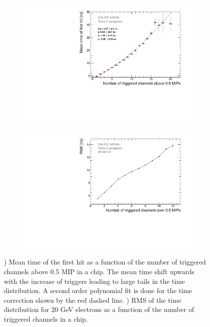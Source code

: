 \documentclass{JINST}
\begin{document}
\begin{figure}[htbp!]
  \begin{subfigure}[t]{0.49\textwidth}
    \centering
    \includegraphics[width=1\linewidth]{fig/NumberHits_Dependance_AllEnergies.pdf}
    \caption{} \label{fig:nhits_profile}
  \end{subfigure}
  \hfill
  \begin{subfigure}[t]{0.49\textwidth}
    \centering
    \includegraphics[width=1\linewidth]{fig/ParametrisationPedestalShift_20GeV.pdf}
    \caption{} \label{fig:nhits_RMS_profile}
  \end{subfigure}
  \caption{) Mean time of the first hit as a function of the number of triggered channels above 0.5 MIP in a chip. The mean time shift upwards with the increase of triggers leading to large tails in the time distribution. A second order polynomial fit is done for the time correction shown by the red dashed line. ) RMS of the time distribution for 20 GeV electrons as a function of the number of triggered channels in a chip.}
\end{figure}
\end{document}
